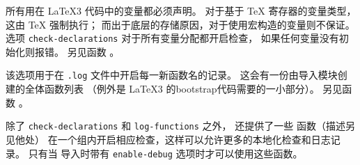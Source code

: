 \documentclass{l3doc}
\begin{document}
%
所有用在 \LaTeX3 代码中的变量都必须声明。
对于基于 \TeX{} 寄存器的变量类型，这由 \TeX{} 强制执行；
而出于底层的存储原因，对于使用宏构造的变量则不保证。
选项 \texttt{check-declarations}  对于所有变量分配都开启检查，
如果任何变量没有初始化则报错。
另见函数  。

%
该选项用于在 \texttt{.log} 文件中开启每一新函数名的记录。
这会有一份由导入模块创建的全体函数列表
（例外是 \LaTeX3 的bootstrap代码需要的一小部分）。
另见函数 。

%
除了 \texttt{check-declarations} 和 \texttt{log-functions} 之外，
 还提供了一些  函数（描述另见他处）
在一个组内开启相应检查，这样可以允许更多的本地化检查和日志记录。
只有当  导入时带有 \texttt{enable-debug} 选项时才可以使用这些函数。
\end{document}
